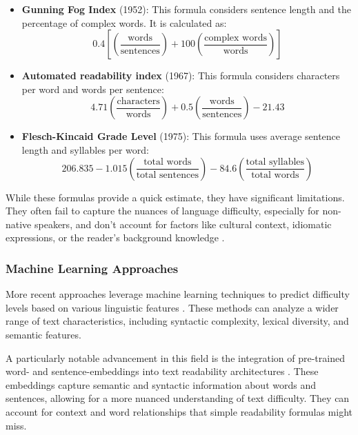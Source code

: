 \begin{itemize}
    \item \textbf{Gunning Fog Index} (1952): This formula considers sentence length and the percentage of complex words. It is calculated as:
    \[0.4 \left[\left( \frac{\text{words}}{\text{sentences}} \right) + 100 \left( \frac{\text{complex words}}{\text{words}} \right)\right]\]
    
    \item \textbf{Automated readability index} (1967): This formula considers characters per word and words per sentence:
    \[4.71 \left(\frac{{\text{characters}}}{\text{words}}\right) + 0.5 \left(\frac{{\text{words}}}{\text{sentences}}\right) - 21.43\]
    
    \item \textbf{Flesch-Kincaid Grade Level} (1975): This formula uses average sentence length and syllables per word:
    \[206.835 - 1.015 \left( \frac{\text{total words}}{\text{total sentences}} \right) - 84.6 \left( \frac{\text{total syllables}}{\text{total words}} \right)\]
\end{itemize}

While these formulas provide a quick estimate, they have significant limitations. They often fail to capture the nuances of language difficulty, especially for non-native speakers, and don't account for factors like cultural context, idiomatic expressions, or the reader's background knowledge \cite{greenfield}.

\subsubsection{Machine Learning Approaches}

More recent approaches leverage machine learning techniques to predict difficulty levels based on various linguistic features \cite{chen2016ctap,franccois2012ai}. These methods can analyze a wider range of text characteristics, including syntactic complexity, lexical diversity, and semantic features.

A particularly notable advancement in this field is the integration of pre-trained word- and sentence-embeddings into text readability architectures \cite{wilkens2022fabra,imperial2021bert,lee2022editable,opencorporaFrench2022}. These embeddings capture semantic and syntactic information about words and sentences, allowing for a more nuanced understanding of text difficulty. They can account for context and word relationships that simple readability formulas might miss.

